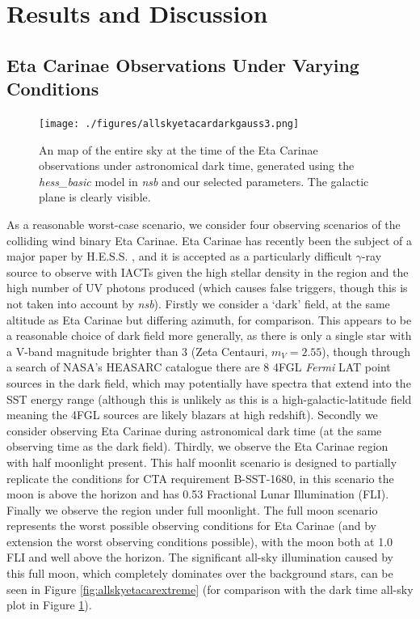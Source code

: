\section{Results and Discussion}
\subsection{Eta Carinae Observations Under Varying Conditions}
\label{sec:etacarvary}
\begin{figure}[ht]
\begin{centering}
\texttt{[image: ./figures/allskyetacardarkgauss3.png]}
\caption{An map of the entire sky at the time of the Eta Carinae observations under astronomical dark time, generated using the \textit{hess\_basic} model in \textit{nsb} and our selected parameters. The galactic plane is clearly visible.}
\label{fig:allskyetacardarkgauss3}
\end{centering}
\end{figure}
As a reasonable worst-case scenario, we consider four observing scenarios of the colliding wind binary Eta Carinae. Eta Carinae has recently been the subject of a major paper by H.E.S.S. \cite{hessetacar}, and it is accepted as a particularly difficult $\gamma$-ray source to observe with IACTs given the high stellar density in the region and the high number of UV photons produced (which causes false triggers, though this is not taken into account by \textit{nsb}). Firstly we consider a `dark' field, at the same altitude as Eta Carinae but differing azimuth, for comparison. This appears to be a reasonable choice of dark field more generally, as there is only a single star with a V-band magnitude brighter than 3 (Zeta Centauri, $m_V=2.55$), though through a search of NASA's HEASARC catalogue there are 8 4FGL \textit{Fermi} LAT point sources in the dark field, which may potentially have spectra that extend into the SST energy range (although this is unlikely as this is a high-galactic-latitude field meaning the 4FGL sources are likely blazars at high redshift). Secondly we consider observing Eta Carinae during astronomical dark time (at the same observing time as the dark field). Thirdly, we observe the Eta Carinae region with half moonlight present. This half moonlit scenario is designed to partially replicate the conditions for CTA requirement B-SST-1680, in this scenario the moon is above the horizon and has 0.53 Fractional Lunar Illumination (FLI). Finally we observe the region under full moonlight. The full moon scenario represents the worst possible observing conditions for Eta Carinae (and by extension the worst observing conditions possible), with the moon both at 1.0 FLI and well above the horizon. The significant all-sky illumination caused by this full moon, which completely dominates over the background stars, can be seen in Figure \ref{fig:allskyetacarextreme} (for comparison with the dark time all-sky plot in Figure \ref{fig:allskyetacardarkgauss3}).

